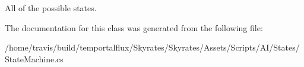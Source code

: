 All of the possible states. 



The documentation for this class was generated from the following file\-:\begin{DoxyCompactItemize}
\item 
/home/travis/build/temportalflux/\-Skyrates/\-Skyrates/\-Assets/\-Scripts/\-A\-I/\-States/State\-Machine.\-cs\end{DoxyCompactItemize}
